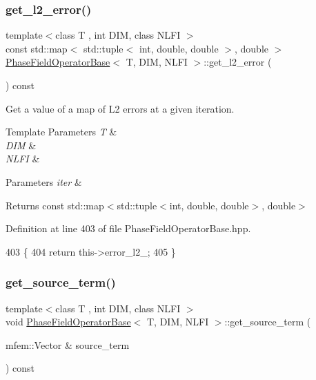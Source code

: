 \subsubsection{\texorpdfstring{get\+\_\+l2\+\_\+error()}{get\_l2\_error()}}
{\footnotesize\ttfamily template$<$class T , int D\+IM, class N\+L\+FI $>$ \\
const std\+::map$<$ std\+::tuple$<$ int, double, double $>$, double $>$ \hyperlink{classPhaseFieldOperatorBase}{Phase\+Field\+Operator\+Base}$<$ T, D\+IM, N\+L\+FI $>$\+::get\+\_\+l2\+\_\+error (\begin{DoxyParamCaption}{ }\end{DoxyParamCaption}) const}



Get a value of a map of L2 errors at a given iteration. 


\begin{DoxyTemplParams}{Template Parameters}
{\em T} & \\
\hline
{\em D\+IM} & \\
\hline
{\em N\+L\+FI} & \\
\hline
\end{DoxyTemplParams}

\begin{DoxyParams}{Parameters}
{\em iter} & \\
\hline
\end{DoxyParams}
\begin{DoxyReturn}{Returns}
const std\+::map$<$std\+::tuple$<$int, double, double$>$, double$>$ 
\end{DoxyReturn}


Definition at line 403 of file Phase\+Field\+Operator\+Base.\+hpp.


\begin{DoxyCode}
403                                                          \{
404   \textcolor{keywordflow}{return} this->error\_l2\_;
405 \}
\end{DoxyCode}
\mbox{\label{classPhaseFieldOperatorBase_ade4aaf43e627fdc8b2a3690839e225d3}} 
\subsubsection{\texorpdfstring{get\+\_\+source\+\_\+term()}{get\_source\_term()}}
{\footnotesize\ttfamily template$<$class T , int D\+IM, class N\+L\+FI $>$ \\
void \hyperlink{classPhaseFieldOperatorBase}{Phase\+Field\+Operator\+Base}$<$ T, D\+IM, N\+L\+FI $>$\+::get\+\_\+source\+\_\+term (\begin{DoxyParamCaption}\item[{mfem\+::\+Vector \&}]{source\+\_\+term }\end{DoxyParamCaption}) const}



